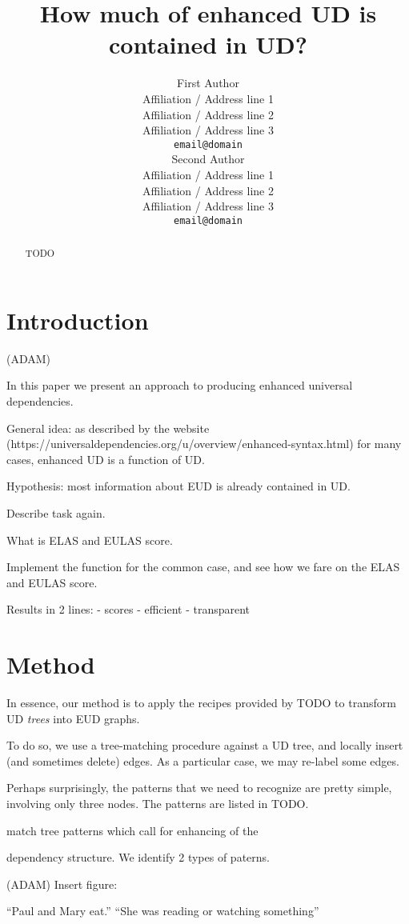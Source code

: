 \documentclass[11pt,a4paper]{article}
\title{How much of enhanced UD is contained in UD?}
\author{First Author \\
  Affiliation / Address line 1 \\
  Affiliation / Address line 2 \\
  Affiliation / Address line 3 \\
  \texttt{email@domain} \\\And
  Second Author \\
  Affiliation / Address line 1 \\
  Affiliation / Address line 2 \\
  Affiliation / Address line 3 \\
  \texttt{email@domain} \\}
\date{}
\begin{document}
\maketitle
\begin{abstract}
  TODO
\end{abstract}

\section{Introduction}
(ADAM)

In this paper we present an approach to producing enhanced universal
dependencies.

General idea: as described by the website
(https://universaldependencies.org/u/overview/enhanced-syntax.html)
for many cases, enhanced UD is a function of UD.

Hypothesis: most information about EUD is already contained in UD.

Describe task again.

What is ELAS and EULAS  score.

Implement the function for the common case, and see how we fare on the
ELAS and EULAS  score.

Results in 2 lines:
- scores
- efficient
- transparent

\section{Method}


In essence, our method is to apply the recipes provided by TODO to
transform UD \emph{trees} into EUD graphs.

To do so, we use a tree-matching procedure against a UD tree, and
locally insert (and sometimes delete) edges. As a particular case, we
may re-label some edges.

Perhaps surprisingly, the patterns that we need to recognize are
pretty simple, involving only three nodes. The patterns are listed in
TODO.


match tree patterns which call for enhancing of the

dependency structure. We identify 2 types of paterns.

(ADAM) Insert figure:

``Paul and Mary eat.''
``She was reading or watching something''
\end{document}

